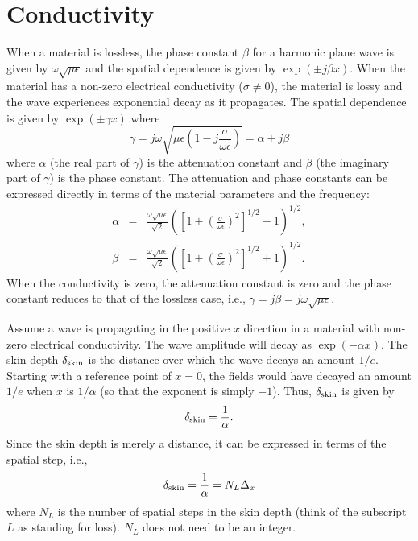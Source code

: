 \section{Conductivity \label{sec:conductivity}}

When a material is lossless, the phase constant $\beta$ for a harmonic
plane wave is given by $\omega\sqrt{\mu\epsilon}$ and the spatial
dependence is given by $\exp(\pm j\beta x)$.  When the material has a
non-zero electrical conductivity ($\sigma\neq 0$), the material is
lossy and the wave experiences exponential decay as it propagates.
The spatial dependence is given by $\exp(\pm\gamma x)$ where
\begin{equation}
  \gamma = j\omega\sqrt{\mu\epsilon
                       \left(1-j\frac{\sigma}{\omega\epsilon}\right)}
         = \alpha+j\beta
\end{equation}
where $\alpha$ (the real part of $\gamma$) is the attenuation constant
and $\beta$ (the imaginary part of $\gamma$) is the phase constant.
The attenuation and phase constants can be expressed directly in terms
of the material parameters and the frequency:
\begin{eqnarray}
  \alpha &=& \frac{\omega\sqrt{\mu\epsilon}}{\sqrt{2}}
   \left(\left[1+\left(\frac{\sigma}{\omega\epsilon}\right)^2\right]^{1/2}
   -1\right)^{1/2},
  \label{eq:alpha}
 \\
  \beta &=& \frac{\omega\sqrt{\mu\epsilon}}{\sqrt{2}}
   \left(\left[1+\left(\frac{\sigma}{\omega\epsilon}\right)^2\right]^{1/2}
   +1\right)^{1/2}.
  \label{eq:lossyK}
\end{eqnarray}
When the conductivity is zero, the attenuation constant is zero and
the phase constant reduces to that of the lossless case, i.e.,
$\gamma=j\beta=j\omega\sqrt{\mu\epsilon}$.

Assume a wave is propagating in the positive $x$ direction in a
material with non-zero electrical conductivity.  The wave amplitude
will decay as $\exp(-\alpha x)$.  The skin depth $\delta_{\mbox{\scriptsize skin}}$ is the
distance over which the wave decays an amount $1/e$.  Starting with a
reference point of $x=0$, the fields would have decayed an amount
$1/e$ when $x$ is $1/\alpha$ (so that the exponent is simply $-1$).
Thus, $\delta_{\mbox{\scriptsize skin}}$ is given by
\begin{equation}
  \delta_{\mbox{\scriptsize skin}} = \frac{1}{\alpha}.
\end{equation}
Since the skin depth is merely a distance, it can be expressed in
terms of the spatial step, i.e., 
\begin{equation}
  \delta_{\mbox{\scriptsize skin}} = \frac{1}{\alpha}= N_L\Delta_x
\end{equation}
where $N_L$ is the number of spatial steps in the skin depth (think of
the subscript $L$ as standing for loss).  $N_L$ does not need to be an
integer.

